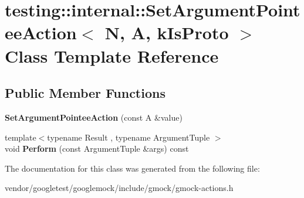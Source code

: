 \hypertarget{classtesting_1_1internal_1_1_set_argument_pointee_action}{}\section{testing\+:\+:internal\+:\+:Set\+Argument\+Pointee\+Action$<$ N, A, k\+Is\+Proto $>$ Class Template Reference}
\label{classtesting_1_1internal_1_1_set_argument_pointee_action}
\subsection*{Public Member Functions}
\begin{DoxyCompactItemize}
\item 
\mbox{\label{classtesting_1_1internal_1_1_set_argument_pointee_action_a5a4119ed113667bd4a003ab0bec2cdff}} 
{\bfseries Set\+Argument\+Pointee\+Action} (const A \&value)
\item 
\mbox{\label{classtesting_1_1internal_1_1_set_argument_pointee_action_a128320dcf991ff7f1a0087dab38b4014}} 
{\footnotesize template$<$typename Result , typename Argument\+Tuple $>$ }\\void {\bfseries Perform} (const Argument\+Tuple \&args) const
\end{DoxyCompactItemize}


The documentation for this class was generated from the following file\+:\begin{DoxyCompactItemize}
\item 
vendor/googletest/googlemock/include/gmock/gmock-\/actions.\+h\end{DoxyCompactItemize}
